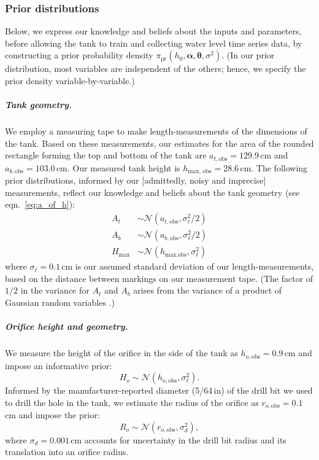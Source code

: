 \documentclass[openacc]{rsproca_new}%
\begin{document}
\subsubsection{Prior distributions} 
Below, we express our knowledge and beliefs about the inputs and parameters, before allowing the tank to train and collecting water level time series data, by constructing a prior probability density $\pi_{\text{pr}}(h_0, \boldsymbol \alpha, \boldsymbol \theta, \sigma^2)$. (In our prior distribution, most variables are independent of the others; hence, we specify the prior density variable-by-variable.)

\vspace{-\baselineskip}
\subparagraph{Tank geometry.} We employ a measuring tape to make length-measurements of the dimensions of the tank.
Based on these measurements, our estimates for the area of the rounded rectangle forming the top and bottom of the tank are $a_{t, \text{obs}}=129.9$\,cm and $a_{b, \text{obs}}=103.0$\,cm. Our measured tank height is $h_{\text{max, obs}}=28.6$\,cm.
The following prior distributions, informed by our [admittedly, noisy and imprecise] measurements, reflect our knowledge and beliefs about the tank geometry (see eqn.~\ref{eq:a_of_h}):
\begin{align}
A_t &\sim \mathcal{N}(a_{t, \text{obs}}, \sigma_\ell^2/2) \label{eq:A_t_prior} \\
A_b &\sim \mathcal{N}(a_{b, \text{obs}}, \sigma_\ell^2/2) \\
H_{\text{max}} &\sim \mathcal{N}(h_{\text{max}, \text{obs}}, \sigma_\ell^2)
\end{align}
where $\sigma_\ell=0.1$\,cm is our assumed standard deviation of our length-measurements, based on the distance between markings on our measurement tape. 
(The factor of $1/2$ in the variance for $A_t$ and $A_b$ arises from the variance of a product of Gaussian random variables \cite{bromiley2003products}.)

\vspace{-\baselineskip}
\subparagraph{Orifice height and geometry.} 
We measure the height of the orifice in the side of the tank as $h_{o, \text{obs}}=0.9$\,cm and impose an informative prior:
\begin{equation}
H_o \sim \mathcal{N}(h_{o, \text{obs}}, \sigma_\ell^2).
\end{equation}
Informed by the manufacturer-reported diameter (5/64\,in) of the drill bit we used to drill the hole in the tank, we estimate the radius of the orifice as $r_{o, \text{obs}}=0.1$\,cm and impose the prior:
\begin{equation}
R_o \sim \mathcal{N}(r_{o, \text{obs}}, \sigma_d^2), \label{eq:R_o_prior}
\end{equation}
where $\sigma_d= 0.001$\,cm accounts for uncertainty in the drill bit radius and its translation into an orifice radius.
\end{document}
